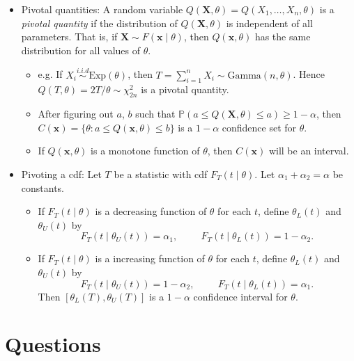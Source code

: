 \documentclass[12pt]{extarticle}
\newcommand{\p}{\mathbb P}
\newcommand{\x}{\mathbf x}
\newcommand{\X}{\mathbf X}
\begin{document}
\begin{itemize}
\begin{itemize}
	\end{itemize}
	\item Pivotal quantities: A random variable $Q(\X, \theta) = Q(X_1, \ldots, X_n, \theta)$ is a \textit{pivotal quantity} if the distribution of $Q(\X, \theta)$ is independent of all parameters. That is, if $\X\sim F(\x\mid \theta)$, then $Q(\x, \theta)$ has the same distribution for all values of $\theta$.
\begin{itemize}
	\item e.g. If $X_i\overset{i.i.d}{\sim}\text{Exp}(\theta)$, then $T = \sum_{i = 1}^nX_i\sim\text{Gamma}(n,\theta)$. Hence $Q(T,\theta) = 2T/\theta\sim \chi_{2n}^2$ is a pivotal quantity.
	\item After figuring out $a$, $b$ such that $\p(a\leq Q(\X,\theta) \leq a) \geq 1-\alpha$, then $C(\x) = \{\theta: a\leq Q(\x,\theta) \leq b\}$ is a $1 - \alpha$ confidence set for $\theta.$
	\item If $Q(\x, \theta)$ is a monotone function of $\theta$, then $C(\x)$ will be an interval.
\end{itemize}
\item Pivoting a cdf: Let $T$ be a statistic with cdf $F_T(t\mid \theta)$. Let $\alpha_1 + \alpha_2 = \alpha$ be constants.  
\begin{itemize}
	\item If $F_T(t\mid \theta)$ is a decreasing function of $\theta$ for each $t$, define $\theta_L(t)$ and $\theta_U(t)$ by  
	$$F_T(t \mid \theta_U(t)) = \alpha_1, \hspace{1cm} F_T(t \mid \theta_L(t)) = 1-\alpha_2.$$
	\item If $F_T(t\mid \theta)$ is a increasing function of $\theta$ for each $t$, define $\theta_L(t)$ and $\theta_U(t)$ by  
	$$F_T(t \mid \theta_U(t)) = 1-\alpha_2, \hspace{1cm} F_T(t \mid \theta_L(t)) = \alpha_1.$$
	Then $[\theta_L(T),\theta_U(T)]$ is a $1 - \alpha$ confidence interval for $\theta$.
\end{itemize}


\end{itemize}

\section{Questions}
 
\end{document}

